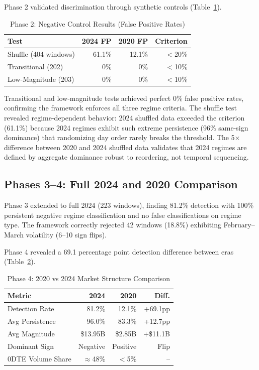 Phase 2 validated discrimination through synthetic controls (Table~\ref{tab:negcontrols}).

\begin{table}[!htbp]
\centering
\caption{Phase 2: Negative Control Results (False Positive Rates)}
\label{tab:negcontrols}
\small
\begin{tabular}{@{}lrrr@{}}
\toprule
\textbf{Test} & \textbf{2024 FP} & \textbf{2020 FP} & \textbf{Criterion} \\
\midrule
Shuffle (404 windows) & 61.1\% & 12.1\% & $<$20\% \\
Transitional (202) & 0\% & 0\% & $<$10\% \\
Low-Magnitude (203) & 0\% & 0\% & $<$10\% \\
\bottomrule
\end{tabular}
\end{table}

Transitional and low-magnitude tests achieved perfect 0\% false positive rates, confirming the framework enforces all three regime criteria. The shuffle test revealed regime-dependent behavior: 2024 shuffled data exceeded the criterion (61.1\%) because 2024 regimes exhibit such extreme persistence (96\% same-sign dominance) that randomizing day order rarely breaks the threshold. The 5$\times$ difference between 2020 and 2024 shuffled data validates that 2024 regimes are defined by aggregate dominance robust to reordering, not temporal sequencing.

\subsection{Phases 3--4: Full 2024 and 2020 Comparison}

Phase 3 extended to full 2024 (223 windows), finding 81.2\% detection with 100\% persistent negative regime classification and no false classifications on regime type. The framework correctly rejected 42 windows (18.8\%) exhibiting February--March volatility (6--10 sign flips).

Phase 4 revealed a 69.1 percentage point detection difference between eras (Table~\ref{tab:phase4}).

\begin{table}[!htbp]
\centering
\caption{Phase 4: 2020 vs 2024 Market Structure Comparison}
\label{tab:phase4}
\begin{tabular}{@{}lrrr@{}}
\toprule
\textbf{Metric} & \textbf{2024} & \textbf{2020} & \textbf{Diff.} \\
\midrule
Detection Rate & 81.2\% & 12.1\% & +69.1pp \\
Avg Persistence & 96.0\% & 83.3\% & +12.7pp \\
Avg Magnitude & \$13.95B & \$2.85B & +\$11.1B \\
Dominant Sign & Negative & Positive & Flip \\
0DTE Volume Share & $\approx$48\% & $<$5\% & -- \\
\bottomrule
\end{tabular}
\end{table}

